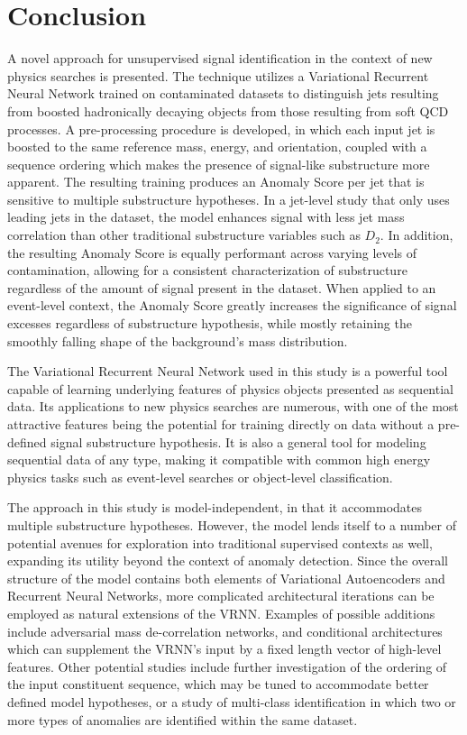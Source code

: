 \documentclass[12pt, a4paper]{article}
\begin{document}
\clearpage

\section*{Conclusion}

A novel approach for unsupervised signal identification in the context of new physics searches is presented. 
The technique utilizes a Variational Recurrent Neural Network trained on contaminated datasets to distinguish jets resulting from boosted hadronically decaying objects from those resulting from soft QCD processes. 
A pre-processing procedure is developed, in which each input jet is boosted to the same reference mass, energy, and orientation, coupled with a sequence ordering which makes the presence of signal-like substructure more apparent. 
The resulting training produces an Anomaly Score per jet that is sensitive to multiple substructure hypotheses. 
In a jet-level study that only uses leading jets in the dataset, the model enhances signal with less jet mass correlation than other traditional substructure variables such as $D_2$. 
In addition, the resulting Anomaly Score is equally performant across varying levels of contamination, allowing for a consistent characterization of substructure regardless of the amount of signal present in the dataset. 
When applied to an event-level context, the Anomaly Score greatly increases the significance of signal excesses regardless of substructure hypothesis, while mostly retaining the smoothly falling shape of the background's mass distribution.

The Variational Recurrent Neural Network used in this study is a powerful tool capable of learning underlying features of physics objects presented as sequential data. 
Its applications to new physics searches are numerous, with one of the most attractive features being the potential for training directly on data without a pre-defined signal substructure hypothesis. 
It is also a general tool for modeling sequential data of any type, making it compatible with common high energy physics tasks such as event-level searches or object-level classification.

The approach in this study is model-independent, in that it accommodates multiple substructure hypotheses.
However, the model lends itself to a number of potential avenues for exploration into traditional supervised contexts as well, expanding its utility beyond the context of anomaly detection.
Since the overall structure of the model contains both elements of Variational Autoencoders and Recurrent Neural Networks, more complicated architectural iterations can be employed as natural extensions of the VRNN. 
Examples of possible additions include adversarial mass de-correlation networks, and conditional architectures which can supplement the VRNN's input by a fixed length vector of high-level features. Other potential studies include further investigation of the ordering of the input constituent sequence, which may be tuned to accommodate better defined model hypotheses, or a study of multi-class identification in which two or more types of anomalies are identified within the same dataset.
\end{document}
